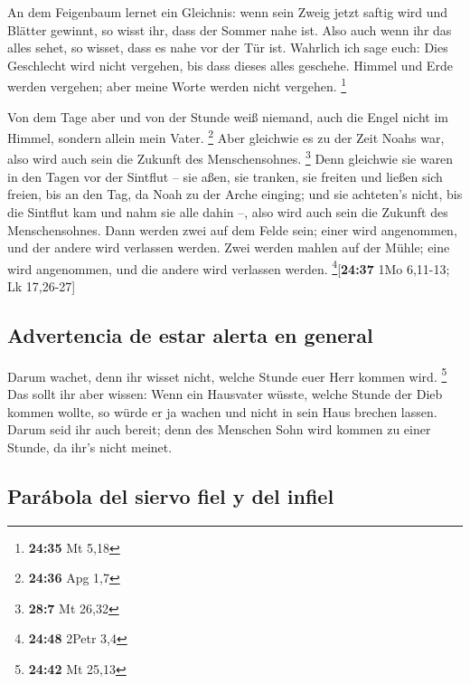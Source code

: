  An dem Feigenbaum lernet ein Gleichnis: wenn sein Zweig
jetzt saftig wird und Blätter gewinnt, so wisst ihr, dass der Sommer
nahe ist.  Also auch wenn ihr das alles sehet, so wisset,
dass es nahe vor der Tür ist.  Wahrlich ich sage euch:
Dies Geschlecht wird nicht vergehen, bis dass dieses alles geschehe.
 Himmel und Erde werden vergehen; aber meine Worte werden
nicht vergehen. \footnote{\textbf{24:35} Mt 5,18}

 Von dem Tage aber und von der Stunde weiß niemand, auch
die Engel nicht im Himmel, sondern allein mein Vater. \footnote{\textbf{24:36}
  Apg 1,7}  Aber gleichwie es zu der Zeit Noahs war, also
wird auch sein die Zukunft des Menschensohnes. \footnote{\textbf{28:7}
  Mt 26,32}  Denn gleichwie sie waren in den Tagen vor
der Sintflut -- sie aßen, sie tranken, sie freiten und ließen sich
freien, bis an den Tag, da Noah zu der Arche einging; 
und sie achteten's nicht, bis die Sintflut kam und nahm sie alle dahin
--, also wird auch sein die Zukunft des Menschensohnes. 
Dann werden zwei auf dem Felde sein; einer wird angenommen, und der
andere wird verlassen werden.  Zwei werden mahlen auf der
Mühle; eine wird angenommen, und die andere wird verlassen werden.
\footnote{\textbf{24:48} 2Petr 3,4}{[}\textbf{24:37} 1Mo 6,11-13; Lk
17,26-27{]}

\hypertarget{advertencia-de-estar-alerta-en-general}{%
\subsection{Advertencia de estar alerta en
general}\label{advertencia-de-estar-alerta-en-general}}

 Darum wachet, denn ihr wisset nicht, welche Stunde euer
Herr kommen wird. \footnote{\textbf{24:42} Mt 25,13}  Das
sollt ihr aber wissen: Wenn ein Hausvater wüsste, welche Stunde der Dieb
kommen wollte, so würde er ja wachen und nicht in sein Haus brechen
lassen.  Darum seid ihr auch bereit; denn des Menschen
Sohn wird kommen zu einer Stunde, da ihr's nicht meinet.

\hypertarget{paruxe1bola-del-siervo-fiel-y-del-infiel}{%
\subsection{Parábola del siervo fiel y del
infiel}\label{paruxe1bola-del-siervo-fiel-y-del-infiel}}

